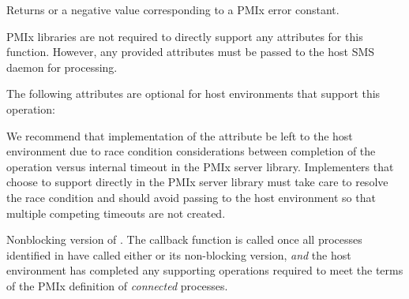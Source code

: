 \begin{arglist}
\end{arglist}

Returns  or a negative value corresponding to a PMIx error constant.

\reqattrstart
\ac{PMIx} libraries are not required to directly support any attributes for this function. However, any provided attributes must be passed to the host \ac{SMS} daemon for processing.

\reqattrend

\optattrstart
The following attributes are optional for host environments that support this operation:


\optattrend

\adviceimplstart
We recommend that implementation of the  attribute be left to the host environment due to race condition considerations between completion of the operation versus internal timeout in the \ac{PMIx} server library. Implementers that choose to support  directly in the \ac{PMIx} server library must take care to resolve the race condition and should avoid passing  to the host environment so that multiple competing timeouts are not created.
\adviceimplend

\descr

Nonblocking version of . The callback function is called once all processes identified in  have called either  or its non-blocking version, \textit{and} the host environment has completed any supporting operations required to meet the terms of the \ac{PMIx} definition of \textit{connected} processes.


\subsection{}

